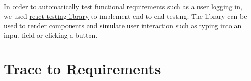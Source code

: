 \documentclass[12pt, titlepage]{article}
\begin{document}
In order to automatically test functional requirements such as a user logging in, we used \href{https://testing-library.com/docs/react-testing-library/intro/}{react-testing-library} to implement end-to-end testing. The library can be used to render components and simulate user interaction such as typing into an input field or clicking a button. 

\section{Trace to Requirements}
\end{document}
